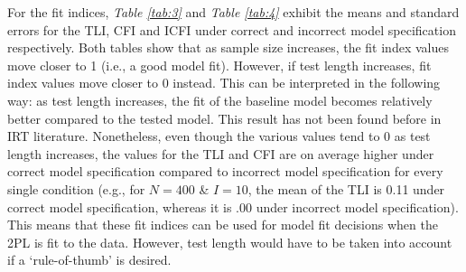 \documentclass[Royal,sageapa,times,doublespace]{sagej}
\begin{document}
\indent For the fit indices, \textit{Table \ref{tab:3}} and \textit{Table \ref{tab:4}} exhibit the means and standard errors for the TLI, CFI and ICFI under correct and incorrect model specification respectively. Both tables show that as sample size increases, the fit index values move closer to 1 (i.e., a good model fit). However, if test length increases, fit index values move closer to 0 instead. This can be interpreted in the following way: as test length increases, the fit of the baseline model becomes relatively better compared to the tested model. This result has not been found before in IRT literature. Nonetheless, even though the various values tend to 0 as test length increases, the values for the TLI and CFI are on average higher under correct model specification compared to incorrect model specification for every single condition (e.g., for $N = 400$ \& $I = 10$, the mean of the TLI is 0.11 under correct model specification, whereas it is .00 under incorrect model specification). This means that these fit indices can be used for model fit decisions when the 2PL is fit to the data. However, test length would have to be taken into account if a `rule-of-thumb' is desired. \\
\end{document}
